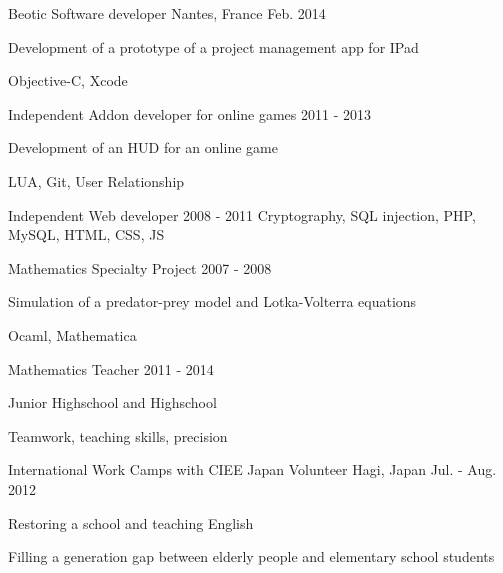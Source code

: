 \begin{cventries}
  \cventrysix
    {Beotic} %
    {Software developer} %
    {Nantes, France} %
    {Feb. 2014} %
    {
      \begin{cvitems} %
        \item {Development of a prototype of a project management app for IPad}
      \end{cvitems}
    }%
    {Objective-C, Xcode}


  \cventrysix
    {} %
    {Independent Addon developer for online games} %
    {} %
    {2011 - 2013} %
    {
      \begin{cvitems} %
        \item {Development of an HUD for an online game}
      \end{cvitems}
    }%
    {LUA, Git, User Relationship}


  \cventryskill
    {} %
    {Independent Web developer} %
    {} %
    {2008 - 2011} %
    {Cryptography, SQL injection, PHP, MySQL, HTML, CSS, JS}


  \cventrysix
    {} %
    {Mathematics Specialty Project} %
    {} %
    {2007 - 2008} %
    {
      \begin{cvitems} %
        \item {Simulation of a predator-prey model and Lotka-Volterra equations}
      \end{cvitems}
    }%
    {Ocaml, Mathematica}


  \cventrysix
    {} %
    {Mathematics Teacher} %
    {} %
    {2011 - 2014} %
    {
      \begin{cvitems} %
        \item {Junior Highschool and Highschool}
      \end{cvitems}
    }%
    {Teamwork, teaching skills, precision}


  \cventry
    {International Work Camps with CIEE Japan} %
    {Volunteer} %
    {Hagi, Japan} %
    {Jul. - Aug. 2012} %
    {
      \begin{cvitems} %
        \item {Restoring a school and teaching English}
        \item {Filling a generation gap between elderly people and elementary school students}
      \end{cvitems}
    }%

\end{cventries}
